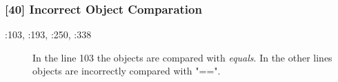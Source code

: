 \subsubsection{[40] Incorrect Object Comparation}
\begin{description}
	\item[:103, :193, :250, :338] In the line 103 the objects are compared with \textit{equals}. In the other lines objects are incorrectly compared with "==". 
\end{description}